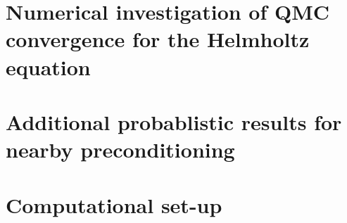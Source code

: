 \documentclass[11pt]{book}
\begin{document}
\chapter{Numerical investigation of QMC convergence for the Helmholtz equation}\label{app:hhqmcconv}


\chapter{Additional probablistic results for nearby preconditioning}\label{app:probnbpc}


\chapter{Computational set-up}\label{app:compsetup}




\end{document}
